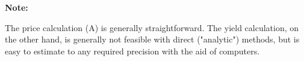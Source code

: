 \documentclass[12pt]{article}
\begin{document}
\begin{flushleft}
    \textbf{Note:} \\
\end{flushleft}

\begin{flushleft}
    The price calculation (A) is generally straightforward.  The yield calculation, on the other hand,
    is generally not feasible with direct ("analytic") methods, but is easy to estimate to any
    required precision with the aid of computers.

\end{flushleft}
\end{document}
